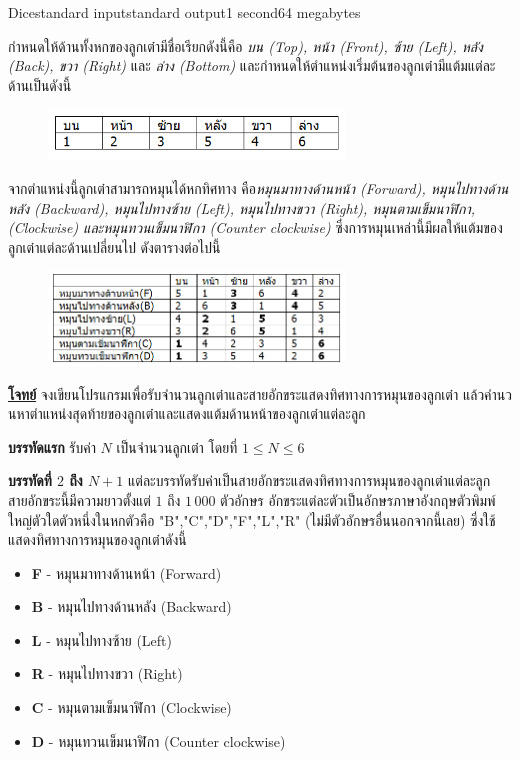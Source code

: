 \documentclass[11pt,a4paper]{article}
\begin{document}
\begin{problem}{Dice}{standard input}{standard output}{1 second}{64 megabytes}

กำหนดให้ด้านทั้งหกของลูกเต๋ามีชื่อเรียกดังนี้คือ \textit{บน (Top), หน้า (Front), ซ้าย (Left), หลัง (Back), ขวา (Right) }และ \textit{ล่าง (Bottom)} และกำหนดให้ตำแหน่งเริ่มต้นของลูกเต๋ามีแต้มแต่ละด้านเป็นดังนี้

\begin{figure}[h]
\centering
\includegraphics[width=0.7\textwidth]{../latex/img/1006/1006-1.png}
\end{figure}

จากตำแหน่งนี้ลูกเต๋าสามารถหมุนได้หกทิศทาง คือ\textit{หมุนมาทางด้านหน้า (Forward), หมุนไปทางด้านหลัง (Backward), หมุนไปทางซ้าย (Left), หมุนไปทางขวา (Right), หมุนตามเข็มนาฬิกา, (Clockwise) และหมุนทวนเข็มนาฬิกา (Counter clockwise)} ซึ่งการหมุนเหล่านี้มีผลให้แต้มของลูกเต๋าแต่ละด้านเปลี่ยนไป ดังตารางต่อไปนี้

\begin{figure}[h]
\centering
\includegraphics[width=0.7\textwidth]{../latex/img/1006/1006-2.png}
\end{figure}


\underline{\textbf{โจทย์}} จงเขียนโปรแกรมเพื่อรับจำนวนลูกเต๋าและสายอักขระแสดงทิศทางการหมุนของลูกเต๋า แล้วคำนวนหาตำแหน่งสุดท้ายของลูกเต๋าและแสดงแต้มด้านหน้าของลูกเต๋าแต่ละลูก

\InputFile

\textbf{บรรทัดแรก} รับค่า $N$ เป็นจำนวนลูกเต๋า โดยที่ $1 \leq N \leq 6$

\textbf{บรรทัดที่ $2$ ถึง $N+1$} แต่ละบรรทัดรับค่าเป็นสายอักขระแสดงทิศทางการหมุนของลูกเต๋าแต่ละลูก สายอักขระนี้มีความยาวตั้งแต่ $1$ ถึง $1\,000$ ตัวอักษร อักขระแต่ละตัวเป็นอักษรภาษาอังกฤษตัวพิมพ์ใหญ่ตัวใดตัวหนึ่งในหกตัวคือ "B","C","D","F","L","R" (ไม่มีตัวอักษรอื่นนอกจากนี้เลย) ซึ่งใช้แสดงทิศทางการหมุนของลูกเต๋าดังนี้
\begin{itemize}

\item \textbf{F }- หมุนมาทางด้านหน้า (Forward)
\item \textbf{B} - หมุนไปทางด้านหลัง (Backward)
\item \textbf{L} - หมุนไปทางซ้าย (Left)
\item \textbf{R} - หมุนไปทางขวา (Right)
\item \textbf{C} - หมุนตามเข็มนาฬิกา (Clockwise)
\item \textbf{D} - หมุนทวนเข็มนาฬิกา (Counter clockwise)


\end{itemize}
\end{problem}
\end{document}
